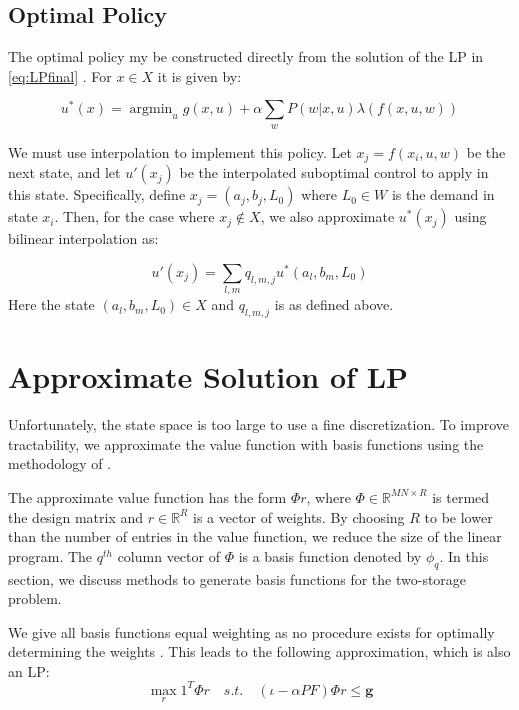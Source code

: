 \documentclass[conference]{IEEEtran}
\DeclareMathOperator*{\argmin}{argmin}
\begin{document}
\subsection{Optimal Policy}
The optimal policy my be constructed directly from the solution of the LP in \eqref{eq:LPfinal} \cite{Bertsekas:2007:DPO:1396348}. For $x\in X$ it is given by:

\begin{equation}
    u^{*}(x)=\argmin_{u} g(x,u)+\alpha \sum_{w} P(w|x,u)\lambda(f(x,u,w))
\end{equation}

We must use interpolation to implement this policy. Let $x_{j}=f(x_{i}, u, w)$ be the next state, and let $u'(x_{j})$ be the interpolated suboptimal control to apply in this state. Specifically, define $x_{j}=(a_{j},b_{j},L_{0})$ where $L_{0}\in W$ is the demand in state $x_{i}$. Then, for the case where $x_{j}\not\in X$, we also approximate $u^{*}(x_{j})$ using bilinear interpolation as:

\begin{equation}
    u'(x_{j})=\sum_{l,m}q_{l,m,j}u^{*}(a_{l},b_{m},L_{0})
\end{equation} Here the state $(a_{l},b_{m},L_{0})\in X$ and $q_{l,m,j}$ is as defined above.


\section{Approximate Solution of LP}
Unfortunately, the state space is too large to use a fine discretization. To improve tractability, we approximate the value function with basis functions using the methodology of \cite{deFarias:2003:LPA:970869.970918}.

The approximate value function has the form $\Phi r$, where $\Phi \in \mathbb{R}^{MN\times R}$ is termed the design matrix and $r\in \mathbb{R}^R$ is a vector of weights. By choosing $R$ to be lower than the number of entries in the value function, we reduce the size of the linear program. The $q^{th}$ column vector of $\Phi$ is a basis function denoted by $\phi_{q}$. In this section, we discuss methods to generate basis functions for the two-storage problem.

We give all basis functions equal weighting as no procedure exists for optimally determining the weights \cite{deFarias:2003:LPA:970869.970918, PatrascuReluEugen2004}. This leads to the following approximation, which is also an LP:
\begin{equation} \label{eq:ApproxLP}
    \max_{r} 1^{T} \Phi r
    \hspace{1em}s.t.\hspace{1em}
    (\iota-\alpha PF)\Phi r \leq \boldsymbol{g}
\end{equation}
\end{document}
